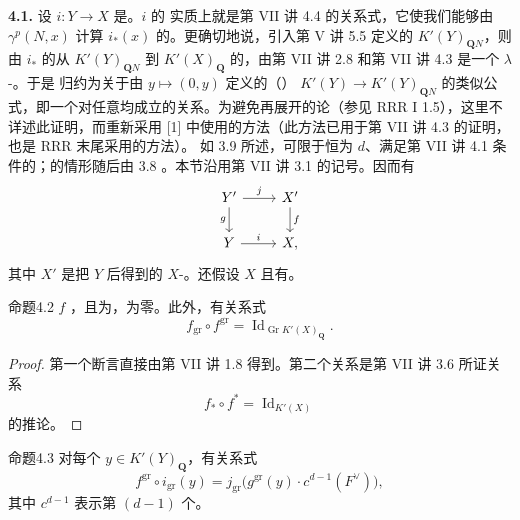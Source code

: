 \textbf{4.1.} 设 $i:Y\to X$ 是。$i$ 的 实质上就是第 VII 讲 4.4 的关系式，它使我们能够由 $\gamma^p(N,x)$ 计算 $i_*(x)$ 的。更确切地说，引入第 V 讲 5.5 定义的 $K'(Y)_{\mathbf QN}$，则由 $i_*$ 的从 $K'(Y)_{\mathbf QN}$ 到 $K'(X)_{\mathbf Q}$ 的，由第 VII 讲 2.8 和第 VII 讲 4.3 是一个 $\lambda$-。于是 归约为关于由 $y\mapsto(0,y)$ 定义的（） $K'(Y)\to K'(Y)_{\mathbf QN}$ 的类似公式，即一个对任意均成立的关系。为避免再展开的论（参见 RRR I 1.5），这里不详述此证明，而重新采用 [1] 中使用的方法（此方法已用于第 VII 讲 4.3 的证明，也是 RRR 末尾采用的方法）。
如 3.9 所述，可限于恒为 $d$、满足第 VII 讲 4.1 条件的；的情形随后由 3.8 。本节沿用第 VII 讲 3.1 的记号。因而有
\[
\begin{tikzcd}Y'\arrow[r,"j"]\arrow[d,"g"']&X'\arrow[d,"f"]\\Y\arrow[r,"i"]&X,\end{tikzcd}
\]
其中 $X'$ 是把 $Y$ 后得到的 $X$-。还假设 $X$ 且有。
\begin{SGAresult}{命题}{4.2}
 $f$ ，且为，为零。此外，有关系式
\[f_{\mathrm{gr}}\circ f^{\mathrm{gr}}=\operatorname{Id}_{\operatorname{Gr}K'(X)_{\mathbf Q}}.\]
\end{SGAresult}
\begin{proof}
第一个断言直接由第 VII 讲 1.8 得到。第二个关系是第 VII 讲 3.6 所证关系
\[f_*\circ f^*=\operatorname{Id}_{K'(X)}\]
的推论。
\end{proof}
\begin{SGAresult}{命题}{4.3}
对每个 $y\in K'(Y)_{\mathbf Q}$，有关系式
\[f^{\mathrm{gr}}\circ i_{\mathrm{gr}}(y)=j_{\mathrm{gr}}\bigl(g^{\mathrm{gr}}(y)\cdot c^{d-1}(F^\vee)\bigr),\]
其中 $c^{d-1}$ 表示第 $(d-1)$ 个。
\end{SGAresult}
